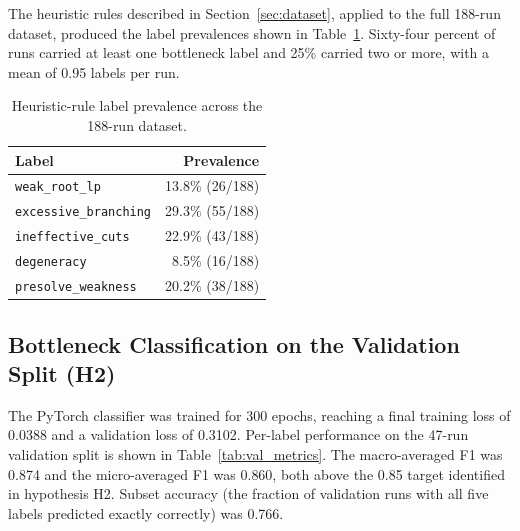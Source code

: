 \documentclass[11pt]{article}
\begin{document}
The heuristic rules described in Section~\ref{sec:dataset}, applied to the full 188-run dataset, produced the label prevalences shown in Table~\ref{tab:prevalence}. Sixty-four percent of runs carried at least one bottleneck label and 25\% carried two or more, with a mean of 0.95 labels per run.

\begin{table}[h]
\centering
\begin{tabular}{lr}
\toprule
\textbf{Label} & \textbf{Prevalence} \\
\midrule
\texttt{weak\_root\_lp}        & 13.8\% (26/188) \\
\texttt{excessive\_branching}  & 29.3\% (55/188) \\
\texttt{ineffective\_cuts}     & 22.9\% (43/188) \\
\texttt{degeneracy}            &  8.5\% (16/188) \\
\texttt{presolve\_weakness}    & 20.2\% (38/188) \\
\bottomrule
\end{tabular}
\caption{Heuristic-rule label prevalence across the 188-run dataset.}
\label{tab:prevalence}
\end{table}

\subsection{Bottleneck Classification on the Validation Split (H2)}

The PyTorch classifier was trained for 300 epochs, reaching a final training loss of 0.0388 and a validation loss of 0.3102. Per-label performance on the 47-run validation split is shown in Table~\ref{tab:val_metrics}. The macro-averaged F1 was 0.874 and the micro-averaged F1 was 0.860, both above the 0.85 target identified in hypothesis H2. Subset accuracy (the fraction of validation runs with all five labels predicted exactly correctly) was 0.766.
\end{document}
